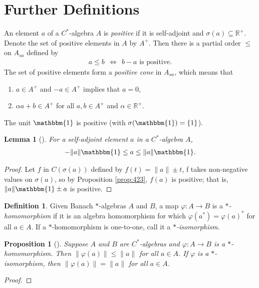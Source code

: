 \documentclass[12pt,a4paper]{report}
\theoremstyle{plain}
\newtheorem{lemma}{Lemma}
\newtheorem{prop}{Proposition}
\theoremstyle{definition}
\newtheorem{defn}{Definition}
\newcommand{\1}{\mathbbm{1}}
\newcommand{\R}{\mathbb{R}}
\renewcommand{\phi}{\varphi}
\newcommand{\spec}[1]{\sigma(#1)}
\begin{document}
\section{Further Definitions}

An element $a$ of a $C^\ast$-algebra $A$ is \emph{positive} if it is self-adjoint and $\spec a
\subseteq \R^+$. 
Denote the set of positive elements in $A$ by $A^+$. Then there is a partial order $\leq$ on 
$A_{sa}$ defined by 
\begin{align*}
	a\leq b ~~\iff~~ b-a \mbox{ is positive}.
\end{align*}
The set of positive elements form a \emph{positive cone} in $A_{sa}$, which means that 
\begin{enumerate}
	\item 	$a\in A^+$ and $-a\in A^+$ implies that $a=0$,
	\item	$\alpha a+b\in A^+$ for all $a,b \in A^+$ and $\alpha\in \R^+$.
\end{enumerate}
The unit $\1$ is positive (with $\spec \1 = \{1\}$). 

\begin{lemma}[{\cite[4.2.3(ii)]{kadison83}}]\label{lemma:423}
	For a self-adjoint element $a$ in a $C^\ast$-algebra $A$, 
	\begin{align*}
		-\|a\|\1\leq a\leq\|a\|\1.
	\end{align*}
\end{lemma}
\begin{proof}
	Let $f$ in $C(\spec a)$ defined by $f(t) = \|a\| \pm t$, f takes non-negative values on $\spec a$, so by Proposition \ref{prop:423}, $f(a)$ is positive; that is, $\|a\|\1 \pm a$ is positive.
\end{proof}
	
\begin{defn}
	Given Banach $\ast$-algebras $A$ and $B$, a map $\phi:A\to B$ is a \emph{$\ast$-homomorphism} 
	if it is an algebra homomorphism for which $\phi(a^\ast) = \phi(a)^\ast$ for all $a \in A$.
	If a $\ast$-homomorphism is one-to-one, call it a \emph{$\ast$-isomorphism}.
\end{defn}

\begin{prop}[{\cite[4.1.8]{kadison83}}] \label{prop:homo}
	Suppose $A$ and $B$ are $C^\ast$-algebras and $\phi:A\to B$ is a $\ast$-homomorphism. Then
	$\|\phi(a)\| \leq \|a\|$ for all $a \in A$. If $\phi$ is a $\ast$-isomorphism, then
	$\|\phi(a)\| = \|a\|$ for all $a \in A$.
\end{prop}
\begin{proof}
	
\end{proof}%
\end{document}
